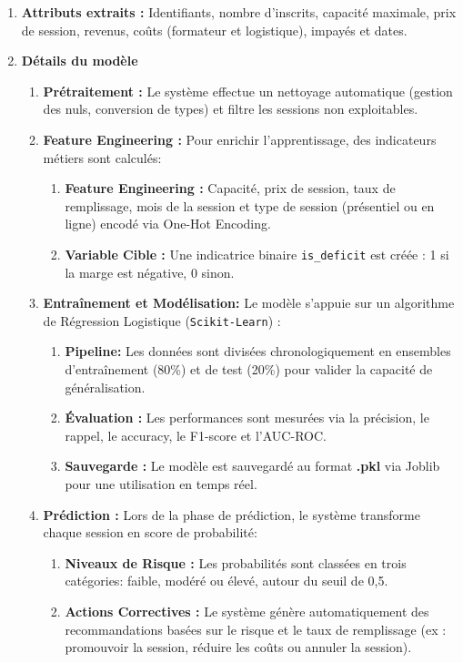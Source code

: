 \begin{enumerate}[label=\textbullet]
  \item \textbf{Attributs extraits :} Identifiants, nombre d'inscrits, capacité maximale, prix de session, revenus, coûts (formateur et logistique), impayés et dates.

\item \textbf{Détails du modèle}
\begin{enumerate}[label=$\star$]
    \item \textbf{Prétraitement :} Le système effectue un nettoyage automatique (gestion des nuls, conversion de types) et filtre les sessions non exploitables.
    \item \textbf{Feature Engineering :} Pour enrichir l'apprentissage, des indicateurs métiers sont calculés:
    \begin{enumerate}[label=\textbullet]
        \item \textbf{Feature Engineering :} Capacité, prix de session, taux de remplissage, mois de la session et type de session (présentiel ou en ligne) encodé via One-Hot Encoding.
        \item \textbf{Variable Cible :} Une indicatrice binaire \texttt{is\_deficit} est créée : 1 si la marge est négative, 0 sinon.
    \end{enumerate}
 \item \textbf{Entraînement et Modélisation:} Le modèle s'appuie sur un algorithme de Régression Logistique (\texttt{Scikit-Learn}) :
 \begin{enumerate}[label=\textbullet]
\item \textbf{Pipeline:} Les données sont divisées chronologiquement en ensembles d'entraînement (80\%) et de test (20\%) pour valider la capacité de généralisation.
\item \textbf{Évaluation :} Les performances sont mesurées via la précision, le rappel, le accuracy, le F1-score et l'AUC-ROC.
\item \textbf{Sauvegarde :} Le modèle est sauvegardé au format \textbf{.pkl} via Joblib pour une utilisation en temps réel.
\end{enumerate}
\item \textbf{Prédiction :} Lors de la phase de prédiction, le système transforme chaque session en score de probabilité:
    \begin{enumerate}[label=\textbullet]
        \item \textbf{Niveaux de Risque :} Les probabilités sont classées en trois catégories: faible, modéré ou élevé, autour du seuil de 0,5.
        \item \textbf{Actions Correctives :} Le système génère automatiquement des recommandations basées sur le risque et le taux de remplissage (ex : promouvoir la session, réduire les coûts ou annuler la session).
\end{enumerate}
\end{enumerate}
\end{enumerate}












